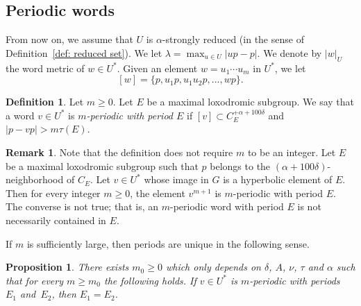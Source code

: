\documentclass[11pt]{article}
\theoremstyle{plain}
\newtheorem{prop}[thm]{Proposition}
\theoremstyle{definition}
\newtheorem{df}[thm]{Definition}
\newtheorem{rem}[thm]{Remark}
\begin{document}
\subsection{Periodic words}
From now on, we assume that $U$ is $\alpha$-strongly reduced (in the sense of Definition~\ref{def: reduced set}).
We let $\lambda = \max_{u\in U}|up-p|$.
We denote by $|w|_U$ the word metric of $w\in U^*$.
Given an element $w = u_1 \cdots u_m$ in $U^*$, we let
\[
[w]=\{p, u_1p,u_1u_2p,\ldots, wp\}.
\]

\begin{df}\label{D: periodic}
Let $m \geq 0$.
Let $E$ be a maximal loxodromic subgroup.
We say that a word $v\in U^*$ is \emph{$m$-periodic with period $E$} if $[v]\subset C_{E}^{+\alpha + 100\delta}$ and $|p-vp| > m \tau(E).$
\end{df}

\begin{rem}
Note that the definition does not require $m$ to be an integer.
Let $E$ be a maximal loxodromic subgroup such that $p$ belongs to the $(\alpha + 100\delta)$-neighborhood of $C_E$.
Let $v \in U^*$ whose image in $G$ is a hyperbolic element of $E$.
Then for every integer $m\geq0$,
the element $v^{m+1}$ is $m$-periodic with period $E$.
The converse is not true; that is, an $m$-periodic word with period $E$ is not necessarily contained in $E$.
\end{rem}

If $m$ is sufficiently large, then periods are unique in the following sense.

\begin{prop}
\label{res: unicity period}
There exists $m_0 \geq 0$ which only depends on $\delta$, $A$, $\nu$, $\tau$ and $\alpha$ such that for every $m \geq m_0$ the following holds.
If $v \in U^*$ is $m$-periodic with periods~$E_1$ and~$E_2$, then $E_1=E_2$.
\end{prop}
\end{document}
